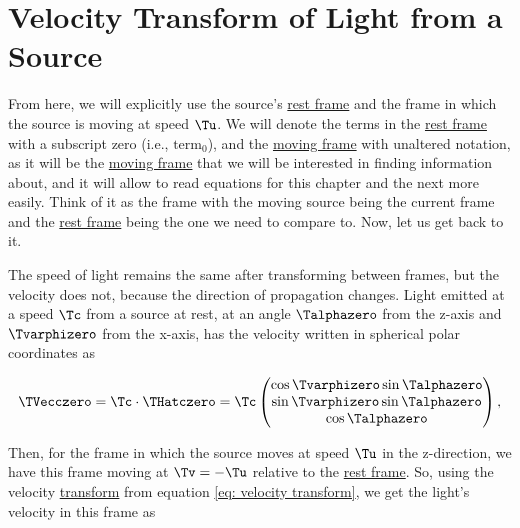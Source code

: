 \section{Velocity Transform of Light from a Source} \label{sect: Light Velocity Transform}

From here, we will explicitly use the source's \hyperlink{def-proper-frame}{rest frame} and the frame in which the source is moving at speed $\Tu $.
We will denote the terms in the \hyperlink{def-proper-frame}{rest frame} with a subscript zero (i.e., $\text{term}_0$), and the \hyperlink{def-Moving-Frame}{moving frame} with unaltered notation, as it will be the \hyperlink{def-Moving-Frame}{moving frame} that we will be interested in finding information about, and it will allow to read equations for this chapter and the next more easily.
Think of it as the frame with the moving source being the current frame and the \hyperlink{def-proper-frame}{rest frame} being the one we need to compare to.
Now, let us get back to it.

The speed of light remains the same after transforming between frames, but the velocity does not, because the direction of propagation changes.
Light emitted at a speed $\Tc $ from a source at rest, at an angle $\Talphazero $ from the z-axis and $\Tvarphizero $ from the x-axis, has the velocity written in spherical polar coordinates as

\begin{equation}
	\TVecczero   = {\Tc } \cdot {\THatczero  }= {\Tc }
	\begin{pmatrix}
		\cos{\Tvarphizero }\sin{\Talphazero } \\
		\sin{\Tvarphizero }\sin{\Talphazero } \\
		\cos{\Talphazero }                \\
	\end{pmatrix},
\end{equation}

Then, for the frame in which the source moves at speed $\Tu $ in the z-direction, we have this frame moving at $\Tv =-\Tu $ relative to the \hyperlink{def-proper-frame}{rest frame}.
So, using the velocity \hyperlink{def-transform}{transform} from equation \eqref{eq: velocity transform}, we get the light's velocity in this frame as



